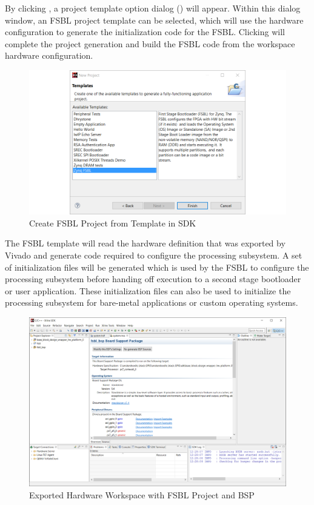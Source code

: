 By clicking , a project template option dialog () will appear. Within this dialog window, an FSBL project template can be selected, which will use the hardware configuration to generate the initialization code for the FSBL. Clicking  will complete the project generation and build the FSBL code from the workspace hardware configuration.

\clearpage
\begin{figure}
	\centering
	\includegraphics{images/sdk/FSBL_Template.png}
	\caption{Create FSBL Project from Template in SDK}
	\label{fig:createfsbltemplate}
\end{figure} 

The FSBL template will read the hardware definition that was exported by Vivado and generate code required to configure the processing subsystem. A set of initialization files will be generated which is used by the FSBL to configure the processing subsystem before handing off execution to a second stage bootloader or user application. These initialization files can also be used to initialize the processing subsystem for bare-metal applications or custom operating systems.

\begin{figure}
	\centering
	\includegraphics{images/sdk/hardware_exported_workspace.png}
	\caption{Exported Hardware Workspace with FSBL Project and BSP}
	\label{fig:workspacefsbl}
\end{figure}


